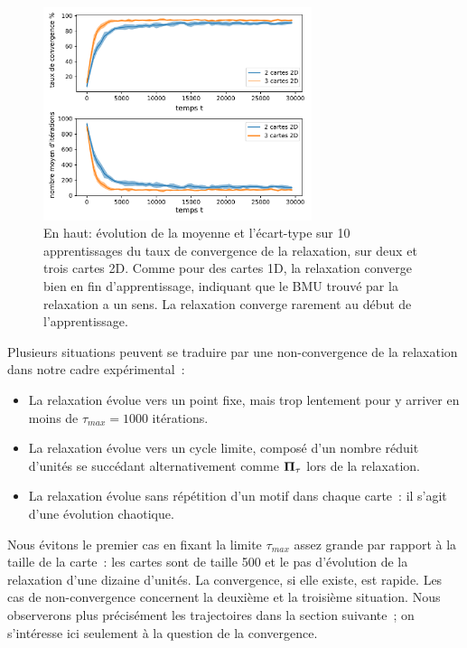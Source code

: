 \documentclass[../main]{subfiles}
\begin{document}
\begin{figure}
	\centering
	\includegraphics[width=0.7\textwidth]{2D_conv_evolution_total_french.pdf}
	\caption{En haut: évolution de la moyenne et l'écart-type sur 10 apprentissages du taux de convergence de la relaxation, sur deux et trois cartes 2D. 
	Comme pour des cartes 1D, la relaxation converge bien en fin d'apprentissage, indiquant que le BMU trouvé par la relaxation a un sens. La relaxation converge rarement au début de l'apprentissage.}
	\label{fig:conv_evolution2D}
	\end{figure}

Plusieurs situations peuvent se traduire par une non-convergence de la relaxation dans notre cadre expérimental~:
\begin{itemize}
\item La relaxation évolue vers un point fixe, mais trop lentement pour y arriver en moins de $\tau_{max} = 1000$ itérations.
\item La relaxation évolue vers un cycle limite, composé d'un nombre réduit d'unités se succédant alternativement comme $\mathbf{\Pi_\tau}$ lors de la relaxation.
\item La relaxation évolue sans répétition d'un motif dans chaque carte~: il s'agit d'une évolution chaotique.
\end{itemize}

Nous évitons le premier cas en fixant la limite $\tau_{max}$ assez grande par rapport à la taille de la carte~: les cartes sont de taille 500 et le pas d'évolution de la relaxation d'une dizaine d'unités.
La convergence, si elle existe, est rapide. Les cas de non-convergence concernent la deuxième et la troisième situation. 
Nous observerons plus précisément les trajectoires dans la section suivante~; on s'intéresse ici seulement à la question de la convergence.
\end{document}
